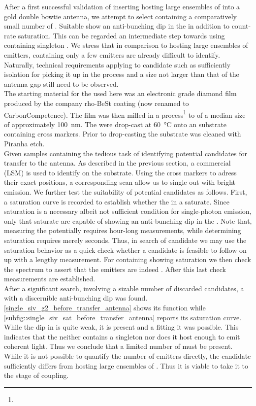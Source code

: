 				After a first successful validation of inserting \nds hosting large ensembles of \sivs into a gold double bowtie antenna, we attempt to select \nds containing a comparatively small number of \sivs. Suitable \nds show an anti-bunching dip in the \gtf in addition to count-rate saturation. This can be regarded an intermediate step towards using \nds containing singleton \sivs. We stress that in comparison to \nds hosting large ensembles of emitters, \nds containing only a few emitters are already difficult to identify. Naturally, technical requirements applying to candidate \nds such as sufficiently isolation for picking it up in the \pp process and a size not larger than that of the antenna gap still need to be observed.
				\\
				The starting material for the \nds used here was an electronic grade diamond film produced by the company rho-BeSt coating (now renamed to CarbonCompetence).
				The film was then milled in a \basd process\footnote{\krueger} to \nds of a median size of approximately \SI{100}{nm}.
				The \nds were drop-cast at \SI{60}{\celsius} onto an \ir substrate containing cross markers. Prior to drop-casting the substrate was cleaned with Piranha etch.
				\\
				Given samples containing \nds the tedious task of identifying potential candidates for transfer to the antenna. As described in the previous section, a commercial \lsm (LSM) is used to identify \nds on the substrate. Using the cross markers to adress their exact positions, a corresponding \fl scan allow us to single out \nds with bright emission. We further test the suitability of potential candidates as follows. First, a saturation curve is recorded to establish whether the \sivs in a \nd saturate. Since saturation is a necessary albeit not sufficient condition for single-photon emission, only \nds that saturate are capable of showing an anti-bunching dip in the \gtf. Note that, measuring the \gtf potentially requires hour-long measurements, while determining saturation requires merely seconds. Thus, in search of candidate \nds we may use the saturation behavior as a quick check whether a candidate is feasible to follow on up with a lengthy \gtf measurement. For \nds containing \sivs showing saturation we then check the spectrum to assert that the emitters are indeed \sivs. After this last check \gtf measurements are established.
				\\
				After a significant search, involving a sizable number of discarded candidates, a \nd with a discernible anti-bunching dip was found. \cref{single_siv_g2_before_transfer_antenna} shows its \gtf function while \cref{subfig::single_siv_sat_before_transfer_antenna} reports its saturation curve. While the dip in \gtf is quite weak, it is present and a fitting it was possible. This indicates that the \nd neither contains a singleton \siv nor does it host enough \sivs to emit coherent light. Thus we conclude that a limited number of \sivs must be present. While it is not possible to quantify the number of emitters directly, the candidate sufficiently differs from \nds hosting large ensembles of \sivs. Thus it is viable to take it to the stage of coupling.

